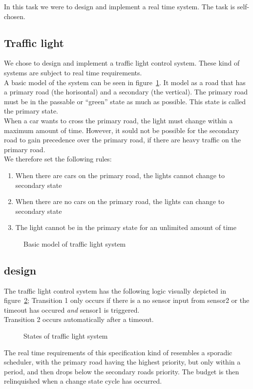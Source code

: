 In this task we were to design and implement a real time system. The task is self-chosen.
\subsection{Traffic light}
We chose to design and implement a traffic light control system. These kind of systems are subject to real time requirements.\\
A basic model of the system can be seen in figure~\ref{fig:traffic_light}. It model as a road that has a primary road (the horisontal) and a secondary (the vertical). The primary road must be in the passable or ``green'' state as much as possible. This state is called the primary state.\\
When a car wants to cross the primary road, the light must change within a maximum amount of time. However, it sould not be possible for the secondary road to gain precedence over the primary road, if there are heavy traffic on the primary road.\\
We therefore set the following rules:
\begin{enumerate}
 \item When there are cars on the primary road, the lights cannot change to secondary state
 \item When there are no cars on the primary road, the lights can change to secondary state
 \item The light cannot be in the primary state for an unlimited amount of time
\end{enumerate}

\begin{figure}
\centering
{}
\caption{Basic model of traffic light system}
\label{fig:traffic_light}

\end{figure}

\subsection{design}
The traffic light control system has the following logic visually depicted in figure~\ref{fig:traffic_light_design}; Transition 1 only occurs if there is a no sensor input from sensor2 or the timeout has occured \emph{and} sensor1 is triggered.\\
Transition 2 occurs automatically after a timeout.

\begin{figure}
\centering
{}
\caption{States of traffic light system}
\label{fig:traffic_light_design}
\end{figure}
The real time requirements of this specification kind of resembles a sporadic scheduler, with the primary road having the highest priority, but only within a period, and then drops below the secondary roads priority. The budget is then relinquished when a change state cycle has occurred.
